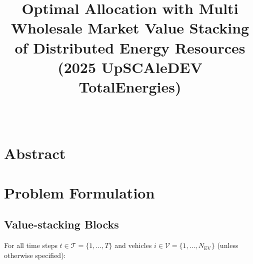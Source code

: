 \documentclass[conference]{IEEEtran}
\begin{document}
\title{Optimal Allocation with Multi Wholesale Market Value Stacking of Distributed Energy Resources \\
(2025 UpSCAleDEV TotalEnergies) \\}
\author{ \\
}



\maketitle
\thispagestyle{plain}
\pagestyle{plain}



\section{Abstract}




\section{Problem Formulation}

\subsection{Value-stacking Blocks}
For all time steps $t \in \mathcal{T} = \{1, \dots, T\}$ and vehicles $i \in \mathcal{V} = \{1, \dots, N_{\text{EV}}\}$ (unless otherwise specified):
\end{document}

